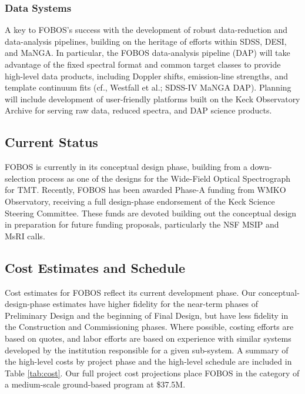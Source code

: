 \subsubsection{Data Systems} A key to FOBOS's success with the
development of robust data-reduction and data-analysis pipelines,
building on the heritage of efforts within SDSS, DESI, and MaNGA. In
particular, the FOBOS data-analysis pipeline (DAP) will take
advantage of the fixed spectral format and common target classes to
provide high-level data products, including Doppler shifts,
emission-line strengths, and template continuum fits (cf., Westfall
et al.; SDSS-IV MaNGA DAP). Planning will include development of
user-friendly platforms built on the Keck Observatory Archive for
serving raw data, reduced spectra, and DAP science products.


\subsection{Current Status} FOBOS is currently in its conceptual design
phase, building from a down-selection process as one of the designs for
the Wide-Field Optical Spectrograph for TMT. Recently, FOBOS has been
awarded Phase-A funding from WMKO Observatory, receiving a full
design-phase endorsement of the Keck Science Steering Committee. These
funds are devoted building out the conceptual design in preparation for
future funding proposals, particularly the NSF MSIP and MsRI calls.

\subsection{Cost Estimates and Schedule}

Cost estimates for FOBOS reflect its current development phase.  Our
conceptual-design-phase estimates have higher fidelity for the near-term
phases of Preliminary Design and the beginning of Final Design, but have
less fidelity in the Construction and Commissioning phases.  Where
possible, costing efforts are based on quotes, and labor efforts are
based on experience with similar systems developed by the institution
responsible for a given sub-system.  A summary of the high-level costs
by project phase and the high-level schedule are included in Table
\ref{tab:cost}.  Our full project cost projections place FOBOS in the
category of a medium-scale ground-based program at \$37.5M.

